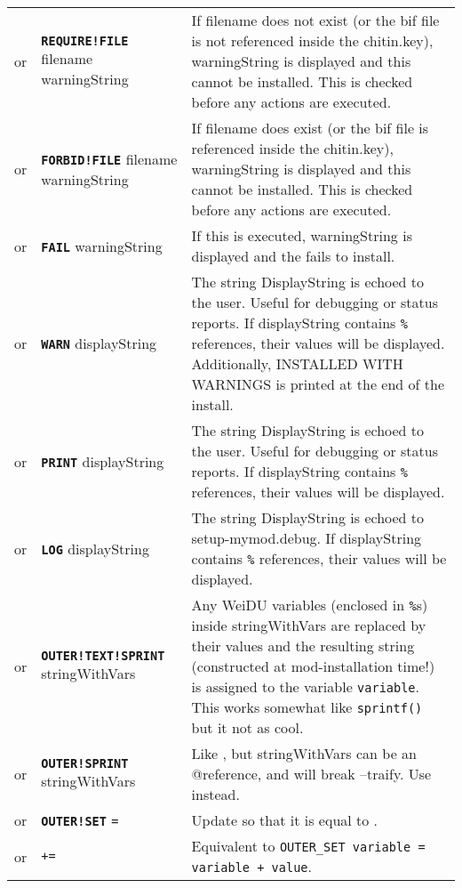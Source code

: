 \documentclass{article}
\def\ttref#1{\ahrefloc{#1}{\tt #1}}
\def\DEFINE#1{{\tt \bf #1}\label{#1}\index{#1}}
\def\t#1{{\tt #1}}
\begin{document}
\begin{tabular}{cp{10in}|p{10in}}
  or & \DEFINE{REQUIRE!FILE} filename warningString &
    If filename does not exist (or the bif file is not referenced inside
    the chitin.key), warningString is displayed and this
    \ttref{component} cannot be installed. This is checked before any
    actions are executed. \\
  or & \DEFINE{FORBID!FILE} filename warningString &
    If filename does exist (or the bif file is referenced inside
    the chitin.key), warningString is displayed and this
    \ttref{component} cannot be installed. This is checked before any
    actions are executed. \\
  or & \DEFINE{FAIL} warningString &
    If this \ttref{TP2 Action} is executed, warningString is displayed and
    the \ttref{component} fails to install. \\
  or & \DEFINE{WARN} displayString &
    The string DisplayString is echoed to the user. Useful for debugging or
    status reports. If displayString contains \t{\%}\ttref{variable}\t{\%}
    references, their values will be displayed. Additionally, INSTALLED WITH
    WARNINGS is printed at the end of the install.
    \\
  or & \DEFINE{PRINT} displayString &
    The string DisplayString is echoed to the user. Useful for debugging or
    status reports. If displayString contains \t{\%}\ttref{variable}\t{\%}
    references, their values will be displayed. \\
  or & \DEFINE{LOG} displayString &
    The string DisplayString is echoed to setup-mymod.debug.
    If displayString contains \t{\%}\ttref{variable}\t{\%}
    references, their values will be displayed. \\
or & \DEFINE{OUTER!TEXT!SPRINT} \ttref{variable} stringWithVars &
  Any WeiDU variables (enclosed in \t{\%}s) inside stringWithVars are
  replaced by their values and the resulting string (constructed at
  mod-installation time!) is assigned to the variable \t{variable}.
  This works somewhat like \t{sprintf()} but it not as cool. \\
or & \DEFINE{OUTER!SPRINT} \ttref{variable} stringWithVars &
  Like \ttref{OUTER!TEXT!SPRINT}, but stringWithVars can be an @reference, and will
  break --traify. Use \ttref{OUTER!TEXT!SPRINT} instead. \\
or & \DEFINE{OUTER!SET} \ttref{variable} \t{=} \ttref{value} &
  Update \ttref{variable} so that it is equal to \ttref{value}. \\
or & \ttref{OUTER!SET} \ttref{variable} \t{+=} \ttref{value} &
  Equivalent to \t{OUTER_SET variable = variable + value}. \\

\end{tabular}
\end{document}
